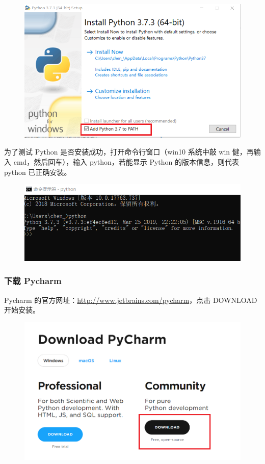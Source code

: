 \begin{figure}[ht]
  \centering
  \includegraphics[scale=0.6]{figure/chapter1/pythonDownload2.png}
\end{figure}

为了测试 Python 是否安装成功，打开命令行窗口（win10 系统中敲 win 健，再输入 cmd，然后回车），输入 python，若能显示 Python 的版本信息，则代表 python 已正确安装。

\begin{figure}[!ht]
  \centering
  \includegraphics[scale=0.7]{figure/chapter1/pythonDownload3.png}
\end{figure}

\subsubsection{下载 Pycharm}


Pycharm 的官方网址：\href{http://www.jetbrains.com/pycharm}{http://www.jetbrains.com/pycharm}，点击 DOWNLOAD 开始安装。

\begin{figure}[!ht]
  \centering
  \includegraphics[scale=0.6]{figure/chapter1/pycharm.png}
\end{figure}


